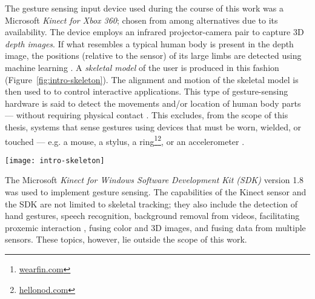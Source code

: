 The gesture sensing input device used during the course of this work was a Microsoft \emph{Kinect for Xbox 360}; chosen from among alternatives due to its availability. The device employs an infrared projector-camera pair to capture 3D \emph{depth images}. If what resembles a typical human body is present in the depth image, the positions (relative to the sensor) of its large limbs are detected using machine learning \parencite{Girshick:2011, Shotton:2011, Shotton:2012, Shotton:2013}. A \emph{skeletal model} of the user is produced in this fashion (Figure~\ref{fig:intro-skeleton}). The alignment and motion of the skeletal model is then used to to control interactive applications. This type of gesture-sensing hardware is said to detect the movements and/or location of human body parts  --- without requiring physical contact \parencite{Turk:2000, Crowley:2000}. This excludes, from the scope of this thesis, systems that sense gestures using devices that must be worn, wielded, or touched --- e.g. a mouse, a stylus, a ring\footnote{\href{http://www.wearfin.com/}{wearfin.com}}\footnote{\href{https://www.hellonod.com/}{hellonod.com}}, or an accelerometer \parencite{Kela:2006, Ashbrook:2010}.

\begin{SCfigure}[\sidecaptionrelwidth][ht]
\centering
\texttt{[image: intro-skeleton]}
\caption{The Microsoft Kinect sensor employs an infrared projector-camera pair to capture 3D depth images, and fits a skeletal model onto what resembles a  human body in the image.}
\label{fig:intro-skeleton}
\end{SCfigure}

The Microsoft \emph{Kinect for Windows Software Development Kit (SDK)} version 1.8 was used to implement gesture sensing. The capabilities of the Kinect sensor and the SDK are not limited to skeletal tracking; they also include the detection of hand gestures, speech recognition, background removal from videos, facilitating proxemic interaction \parencite{Ballendat:2010}, fusing color and 3D images, and fusing data from multiple sensors. These topics, however, lie outside the scope of this work.

